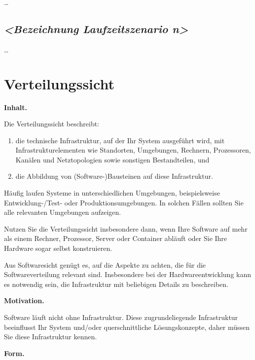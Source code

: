 \documentclass[]{article}
\begin{document}
\ldots{}

\hypertarget{__emphasis_bezeichnung_laufzeitszenario_n_emphasis}{%
\subsection{\texorpdfstring{\emph{\textless{}Bezeichnung
Laufzeitszenario
n\textgreater{}}}{\textless{}Bezeichnung Laufzeitszenario n\textgreater{}}}\label{__emphasis_bezeichnung_laufzeitszenario_n_emphasis}}

\ldots{}

\hypertarget{section-deployment-view}{%
\section{Verteilungssicht}\label{section-deployment-view}}

\textbf{Inhalt.}

Die Verteilungssicht beschreibt:

\begin{enumerate}
\def\labelenumi{\arabic{enumi}.}
\item
  die technische Infrastruktur, auf der Ihr System ausgeführt wird, mit
  Infrastrukturelementen wie Standorten, Umgebungen, Rechnern,
  Prozessoren, Kanälen und Netztopologien sowie sonstigen Bestandteilen,
  und
\item
  die Abbildung von (Software-)Bausteinen auf diese Infrastruktur.
\end{enumerate}

Häufig laufen Systeme in unterschiedlichen Umgebungen, beispielsweise
Entwicklung-/Test- oder Produktionsumgebungen. In solchen Fällen sollten
Sie alle relevanten Umgebungen aufzeigen.

Nutzen Sie die Verteilungssicht insbesondere dann, wenn Ihre Software
auf mehr als einem Rechner, Prozessor, Server oder Container abläuft
oder Sie Ihre Hardware sogar selbst konstruieren.

Aus Softwaresicht genügt es, auf die Aspekte zu achten, die für die
Softwareverteilung relevant sind. Insbesondere bei der
Hardwareentwicklung kann es notwendig sein, die Infrastruktur mit
beliebigen Details zu beschreiben.

\textbf{Motivation.}

Software läuft nicht ohne Infrastruktur. Diese zugrundeliegende
Infrastruktur beeinflusst Ihr System und/oder querschnittliche
Lösungskonzepte, daher müssen Sie diese Infrastruktur kennen.

\textbf{Form.}
\end{document}
